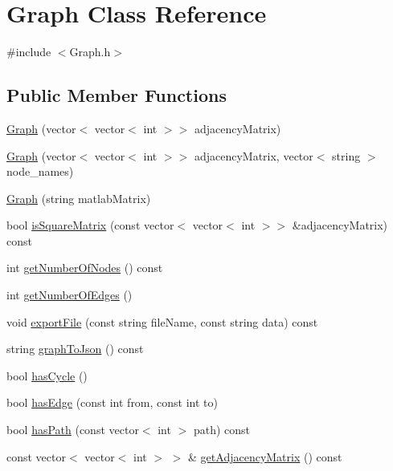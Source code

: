 \hypertarget{class_graph}{\section{Graph Class Reference}
\label{class_graph}
}


{\ttfamily \#include $<$Graph.\-h$>$}

\subsection*{Public Member Functions}
\begin{DoxyCompactItemize}
\item 
\hyperlink{class_graph_a173fa6ec1022bc0f793e3debfd19ad2c}{Graph} (vector$<$ vector$<$ int $>$$>$ adjacency\-Matrix)
\item 
\hyperlink{class_graph_a4141e4b0dc83b8637fed7a88b0abb2a8}{Graph} (vector$<$ vector$<$ int $>$$>$ adjacency\-Matrix, vector$<$ string $>$ node\-\_\-names)
\item 
\hyperlink{class_graph_afa40c944594ef9360902cfa3a754d4ef}{Graph} (string matlab\-Matrix)
\item 
bool \hyperlink{class_graph_a00f613f4d274a895e08988074a3a9e9a}{is\-Square\-Matrix} (const vector$<$ vector$<$ int $>$$>$ \&adjacency\-Matrix) const 
\item 
int \hyperlink{class_graph_a217051ac8e8d46ca74e7837f16fbed96}{get\-Number\-Of\-Nodes} () const 
\item 
int \hyperlink{class_graph_ab532b8f903f75621e6ca3469e8dbe0bf}{get\-Number\-Of\-Edges} ()
\item 
void \hyperlink{class_graph_ac38ffcb580b1a9fa57142812aac33c46}{export\-File} (const string file\-Name, const string data) const 
\item 
string \hyperlink{class_graph_a027c9787cdf583c5e6d1cc048c3a7c32}{graph\-To\-Json} () const 
\item 
bool \hyperlink{class_graph_a6fcbfa381804b43a67d92eed7f30e1d9}{has\-Cycle} ()
\item 
bool \hyperlink{class_graph_a0a4f1d268e549a905d0451cfdfc6f2db}{has\-Edge} (const int from, const int to)
\item 
bool \hyperlink{class_graph_abc5691276d7bab874ae07a40173d50ec}{has\-Path} (const vector$<$ int $>$ path) const 
\item 
const vector$<$ vector$<$ int $>$ $>$ \& \hyperlink{class_graph_a74d5b2bcc4df084d9c4651d3cb2abf1e}{get\-Adjacency\-Matrix} () const 
\item 
$$
\end{DoxyCompactItemize}
